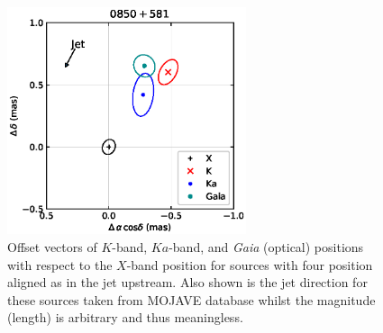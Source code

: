 \documentclass{aa}
\begin{document}
\begin{appendix}
\begin{figure}[hbtp]
        \includegraphics[width=70mm]{figs/0850+581}
        \caption[]{\label{fig:up}
            Offset vectors of $K$-band, $Ka$-band, and {\it Gaia} (optical) positions with respect to the $X$-band position for sources with four position aligned as in the jet upstream.
            Also shown is the jet direction for these sources taken from MOJAVE database whilst the magnitude (length) is arbitrary and thus meaningless.
        }
    \end{figure}



\end{appendix}
\end{document}
